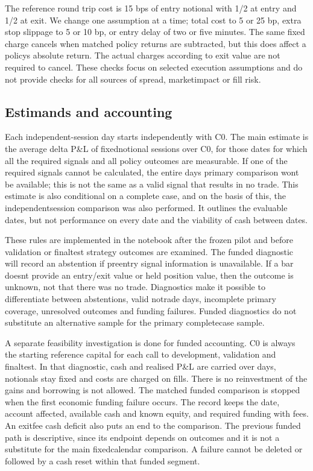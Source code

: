 \documentclass[11pt,a4paper]{article}
\begin{document}
The reference round trip cost is 15 bps of entry notional with 1/2 at entry and 1/2 at exit. We change one assumption at a time; total cost to 5 or 25 bp, extra stop slippage to 5 or 10 bp, or entry delay of two or five minutes. The same fixed charge cancels when matched policy returns are subtracted, but this does affect a policys absolute return. The actual charges according to exit value are not required to cancel. These checks focus on selected execution assumptions and do not provide checks for all sources of spread, market\allowbreak{}impact or fill risk.

\subsection*{Estimands and accounting}

Each independent-session day starts independently with C0. The main estimate is the average delta P\&L of fixed\allowbreak{}notional sessions over C0, for those dates for which all the required signals and all policy outcomes are measurable. If one of the required signals cannot be calculated, the entire days primary comparison wont be available; this is not the same as a valid signal that results in no trade. This estimate is also conditional on a complete case, and on the basis of this, the independent\allowbreak{}session comparison was also performed. It outlines the evaluable dates, but not performance on every date and the viability of cash between dates.

These rules are implemented in the notebook after the frozen pilot and before validation or final\allowbreak{}test strategy outcomes are examined. The funded diagnostic will record an abstention if pre\allowbreak{}entry signal information is unavailable. If a bar doesnt provide an entry/exit value or held position value, then the outcome is unknown, not that there was no trade. Diagnostics make it possible to differentiate between abstentions, valid no\allowbreak{}trade days, incomplete primary coverage, unresolved outcomes and funding failures. Funded diagnostics do not substitute an alternative sample for the primary complete\allowbreak{}case sample.

A separate feasibility investigation is done for funded accounting. C0 is always the starting reference capital for each call to development, validation and final\allowbreak{}test. In that diagnostic, cash and realised P\&L are carried over days, notionals stay fixed and costs are charged on fills. There is no reinvestment of the gains and borrowing is not allowed. The matched funded comparison is stopped when the first economic funding failure occurs. The record keeps the date, account affected, available cash and known equity, and required funding with fees. An exit\allowbreak{}fee cash deficit also puts an end to the comparison. The previous funded path is descriptive, since its endpoint depends on outcomes and it is not a substitute for the main fixed\allowbreak{}calendar comparison. A failure cannot be deleted or followed by a cash reset within that funded segment.
\end{document}
